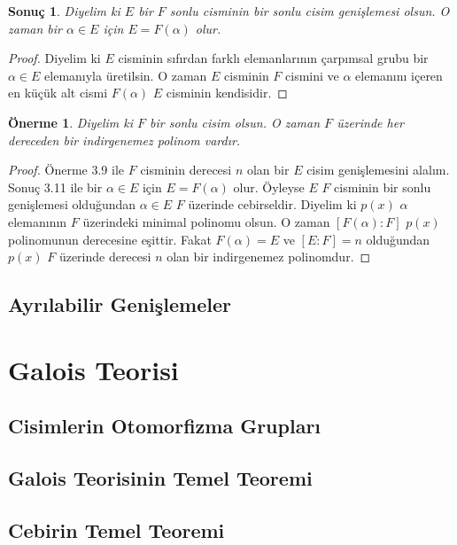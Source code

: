 \documentclass[draft]{article}
\newtheorem{cor}[thm]{Sonuç}
\newtheorem{prop}[thm]{Önerme}
\theoremstyle{definition}
\theoremstyle{remark}
\begin{document}
    	    \begin{cor}
    	        Diyelim ki $E$ bir $F$ sonlu cisminin bir sonlu cisim genişlemesi olsun. O zaman bir $\alpha \in E$ için $E = F(\alpha)$ olur.
    	    \end{cor}
    	    
    	    \begin{proof}
    	        Diyelim ki $E$ cisminin sıfırdan farklı elemanlarının çarpımsal grubu bir $\alpha \in E$ elemanıyla üretilsin. O zaman $E$ cisminin $F$ cismini ve $\alpha$ elemanını içeren en küçük alt cismi $F(\alpha)$ $E$ cisminin kendisidir.
    	    \end{proof}
    	    
    	    \begin{prop}
    	        Diyelim ki $F$ bir sonlu cisim olsun. O zaman $F$ üzerinde her dereceden bir indirgenemez polinom vardır.
    	    \end{prop}
    	    
    	    \begin{proof}
    	        Önerme 3.9 ile $F$ cisminin derecesi $n$ olan bir $E$ cisim genişlemesini alalım. Sonuç 3.11 ile bir $\alpha \in E$ için $E = F(\alpha)$ olur. Öyleyse $E$ $F$ cisminin bir sonlu genişlemesi olduğundan $\alpha \in E$ $F$ üzerinde cebirseldir. Diyelim ki $p(x)$ $\alpha$ elemanının $F$ üzerindeki minimal polinomu olsun. O zaman $[F(\alpha) : F]$ $p(x)$ polinomunun derecesine eşittir. Fakat $F(\alpha) = E$ ve $[E : F] = n$ olduğundan $p(x)$ $F$ üzerinde derecesi $n$ olan bir indirgenemez polinomdur.
    	    \end{proof}
	        
    	\subsection{Ayrılabilir Genişlemeler}
    	
    	    
	
    \section{Galois Teorisi}
    	
    	\subsection{Cisimlerin Otomorfizma Grupları}
    	
    	\subsection{Galois Teorisinin Temel Teoremi}
    	
    	\subsection{Cebirin Temel Teoremi}
	
\newpage

    \begin{thebibliography}{10}
    
    	\bibitem{}
    	
    \end{thebibliography}
	
\end{document}
